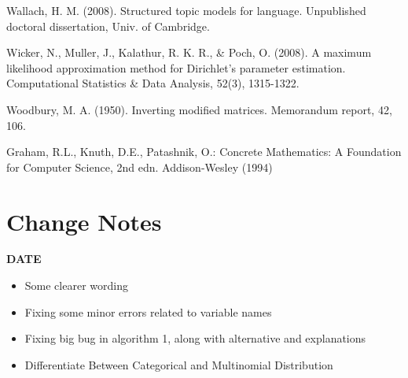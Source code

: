 \documentclass[twoside]{article}
\begin{document}
\begin{thebibliography}{20}
Wallach, H. M. (2008). Structured topic models for language. Unpublished doctoral dissertation, Univ. of Cambridge.

Wicker, N., Muller, J., Kalathur, R. K. R., \& Poch, O. (2008). A maximum likelihood approximation method for Dirichlet's parameter estimation. Computational Statistics \& Data Analysis, 52(3), 1315-1322.

Woodbury, M. A. (1950). Inverting modified matrices. Memorandum report, 42, 106.

Graham, R.L., Knuth, D.E., Patashnik, O.: Concrete Mathematics: A Foundation for Computer Science, 2nd edn. Addison-Wesley (1994)

\end{thebibliography}

\section{Change Notes}
\textbf{DATE}
\begin{itemize}
    \item Some clearer wording
    \item Fixing some minor errors related to variable names
    \item Fixing big bug in algorithm 1, along with alternative and explanations
    \item Differentiate Between Categorical and Multinomial Distribution
\end{itemize}
\end{document}
